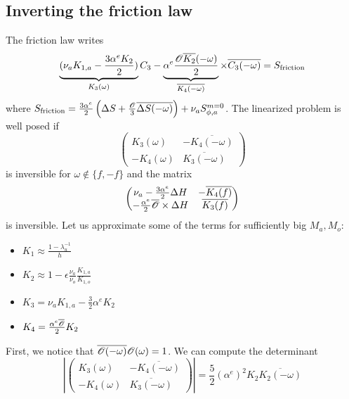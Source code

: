 \begin{subappendices}
\subsection{Inverting the friction law}
The friction law writes
\begin{equation}
	\underbrace{(\nu_a K_{1,a} - \frac{3\alpha^e K_{2}}{2})}_{
		K_3(\omega)
	}{C}_3
	-\underbrace{
		\alpha^e \frac{{\cal O} \overline{K_2}(-\omega)}{2}}_{
		\overline{K_4(-\omega)}}
	\times \overline{{C}_3(-\omega)}
	= S_{\rm friction}
\end{equation}
where $S_{\rm friction} =
	\frac{3\alpha^e}{2} \left(
	\Delta S + \frac{\cal O}{3}
	\overline{\Delta S(-\omega)}\right)
	+\nu_a S_{\phi,a}^{m=0}$.
The linearized problem is well posed if
\begin{equation}
	\begin{pmatrix}
		K_3(\omega)& - \overline{K_4(-\omega)}\\
		-K_4(\omega) & \overline{K_3(-\omega)}
	\end{pmatrix}
\end{equation}
is inversible for $\omega \notin \{f, -f\}$ and
the matrix
\begin{equation}
	\begin{pmatrix}
		\nu_a - \frac{3 \alpha^e}{2}\Delta H &
		-\overline{K_4(f)} \\
		-\frac{\alpha^e}{2}\overline{\cal O} \times \Delta H&
		\overline{K_3(f)}
	\end{pmatrix}
\end{equation}
is inversible.
Let us approximate some of the terms for sufficiently big $M_a, M_o$:
\begin{itemize}
	\item $K_1 \approx \frac{1 - \lambda_u^{-1}}{h}$
	\item $K_2 \approx 1 - \epsilon\frac{\nu_a}{\nu_o}
		\frac{K_{1,a}}{K_{1,o}}$
	\item $K_3 = \nu_a K_{1,a} - \frac{3}{2} \alpha^e K_2$
	\item $K_4 = \frac{\alpha^e \overline{{\cal O}}}
		{2}K_2$
\end{itemize}
First, we notice that $\overline{ {\cal O}(-\omega)}
	{\cal O}(\omega) = 1$.
We can compute the determinant
\begin{equation}
\left|
\begin{pmatrix}
	K_3(\omega)& - \overline{K_4(-\omega)}\\
	-K_4(\omega) & \overline{K_3(-\omega)}
\end{pmatrix}\right|=
\frac{5}{2} (\alpha^e)^2 K_2 \overline{K_2(-\omega)}

\end{equation}
\end{subappendices}
